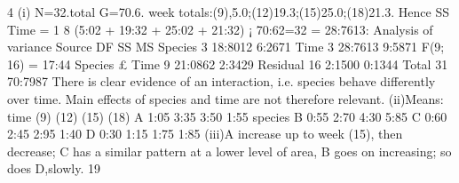 \documentclass[a4paper,12pt]{article}
\begin{document}
\begin{enumerate}
4 (i) N=32.total G=70.6. week totals:(9),5.0;(12)19.3;(15)25.0;(18)21.3. Hence
SS Time =
1
8
(5:02 + 19:32 + 25:02 + 21:32) ¡ 70:62=32 = 28:7613:
Analysis of variance
Source DF SS MS
Species 3 18:8012 6:2671
Time 3 28:7613 9:5871 F(9; 16) = 17:44
Species £ Time 9 21:0862 2:3429
Residual 16 2:1500 0:1344
Total 31 70:7987
There is clear evidence of an interaction, i.e. species behave differently over time.
Main effects of species and time are not therefore relevant.
(ii)Means:
time (9) (12) (15) (18)
A 1:05 3:35 3:50 1:55
species B 0:55 2:70 4:30 5:85
C 0:60 2:45 2:95 1:40
D 0:30 1:15 1:75 1:85
(iii)A increase up to week (15), then decrease; C has a similar pattern at a lower
level of area, B goes on increasing; so does D,slowly.
19

\end{enumerate}
\end{document}
